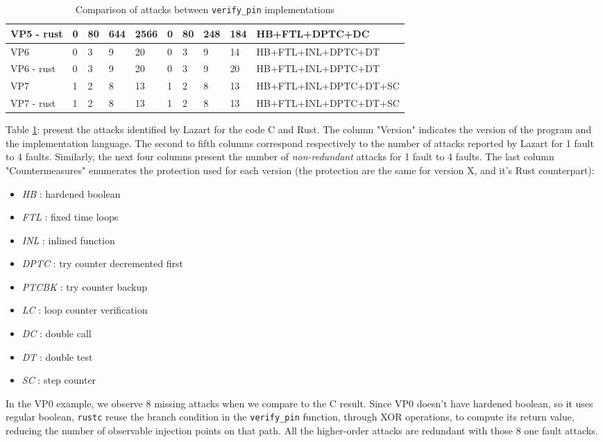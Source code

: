 \begin{table}[t]
\begin{tabular}{l|llll|llll|l}
VP5 - rust & 0  & 80  & 644 & 2566 & 0  & 80 & 248 & 184 & HB+FTL+DPTC+DC        \\
\hline
VP6        & 0  & 3   & 9   & 20   & 0  & 3  & 9   & 14  & HB+FTL+INL+DPTC+DT    \\
VP6 - rust & 0  & 3   & 9   & 20   & 0  & 3  & 9   & 20  & HB+FTL+INL+DPTC+DT    \\
\hline
VP7        & 1  & 2   & 8   & 13   & 1  & 2  & 8   & 13  & HB+FTL+INL+DPTC+DT+SC \\
VP7 - rust & 1  & 2   & 8   & 13   & 1  & 2  & 8   & 13  & HB+FTL+INL+DPTC+DT+SC
\end{tabular}
    \caption{Comparison of attacks between \texttt{verify\_pin} implementations \label{tbl:results-fissc-vp}}
\end{table}

\noindent Table \ref{tbl:results-fissc-vp}: present the attacks identified by Lazart for the code C and Rust.
The column "Version" indicates the version of the program and the implementation language. 
The second to fifth columns correspond respectively to the number of attacks reported by Lazart for 1 fault to 4 faults.
Similarly, the next four columns present the number of \textit{non-redundant} attacks for 1 fault to 4 faults. 
The last column "Countermeasures" enumerates the protection used for each version (the protection are the same for version X, and it's Rust counterpart):
\begin{itemize}
        \item \textit{HB} : hardened boolean
        \item \textit{FTL} : fixed time loops
        \item \textit{INL} : inlined function
        \item \textit{DPTC} : try counter decremented first
        \item \textit{PTCBK} : try counter backup
        \item \textit{LC} : loop counter verification
        \item \textit{DC} : double call
        \item \textit{DT} : double test
        \item \textit{SC} : step counter
\end{itemize}

In the VP0 example, we observe 8 missing attacks when we compare to the C result. Since VP0 doesn't have hardened boolean, so it uses regular boolean, \texttt{rustc} reuse the branch condition in the \texttt{verify\_pin} function, through XOR operations, to compute its return value, reducing the number of observable injection points on that path. All the higher-order attacks are redundant with those 8 one fault attacks.

